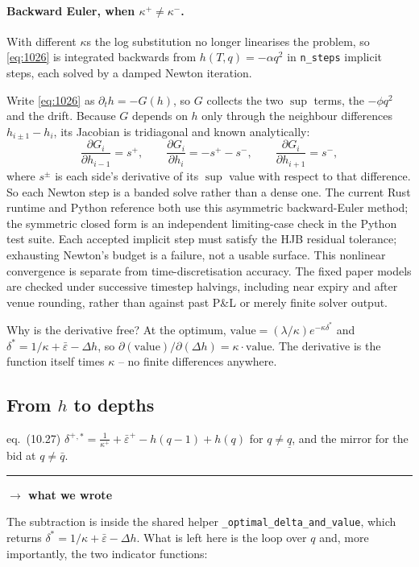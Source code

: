 \documentclass[11pt,a4paper]{article}
\newcommand{\wecode}{\par\vspace{4pt}\noindent
  \textcolor{NavyLink}{\rule{\linewidth}{0.4pt}}\par\vspace{3pt}
  \noindent\textbf{\textcolor{NavyLink}{$\rightarrow$ what we wrote}}\par\vspace{2pt}}
\newcommand{\dplus}{\delta^{+}}
\newcommand{\epsb}{\bar{\varepsilon}}
\newcommand{\code}[1]{\texttt{\small #1}}
\begin{document}
\paragraph{Backward Euler, when $\kappa^{+} \ne \kappa^{-}$.} With different
$\kappa$s the log substitution no longer linearises the problem, so
\eqref{eq:1026} is integrated backwards from $h(T,q) = -\alpha q^{2}$ in
\code{n\_steps} implicit steps, each solved by a damped Newton iteration.

Write \eqref{eq:1026} as $\partial_t h = -G(h)$, so $G$ collects the two $\sup$
terms, the $-\phi q^2$ and the drift. Because $G$ depends on $h$ only through the
neighbour differences $h_{i\pm1} - h_i$, its Jacobian is tridiagonal and known
analytically:
\[
  \frac{\partial G_i}{\partial h_{i-1}} = s^{+},\qquad
  \frac{\partial G_i}{\partial h_{i}} = -s^{+}-s^{-},\qquad
  \frac{\partial G_i}{\partial h_{i+1}} = s^{-},
\]
where $s^{\pm}$ is each side's derivative of its $\sup$ value with respect to
that difference. So each Newton step is a banded solve rather than a dense one.
The current Rust runtime and Python reference both use this asymmetric
backward-Euler method; the symmetric closed form is an independent limiting-case
check in the Python test suite. Each accepted implicit step must satisfy the
HJB residual tolerance; exhausting Newton's budget is a failure, not a usable
surface. This nonlinear convergence is separate from time-discretisation
accuracy. The fixed paper models are checked under successive timestep
halvings, including near expiry and after venue rounding, rather than against
past P\&L or merely finite solver output.

\begin{intuition}
Why is the derivative free? At the optimum, $\text{value} =
(\lambda/\kappa)e^{-\kappa\delta^{*}}$ and $\delta^{*} = 1/\kappa + \epsb -
\Delta h$, so $\partial(\text{value})/\partial(\Delta h) = \kappa \cdot
\text{value}$. The derivative is the function itself times $\kappa$ -- no finite
differences anywhere.
\end{intuition}

\subsection{From \texorpdfstring{$h$}{h} to depths}

\begin{booktocode}{eq.~(10.27)}
$\dplus{}^{,*} = \tfrac{1}{\kappa^{+}} + \epsb^{+} - h(q-1) + h(q)$ for
$q \ne \underline{q}$, and the mirror for the bid at $q \ne \bar{q}$.
\wecode
The subtraction is inside the shared helper \code{\_optimal\_delta\_and\_value},
which returns $\delta^{*} = 1/\kappa + \epsb - \Delta h$. What is left here is
the loop over $q$ and, more importantly, the two indicator functions:
\end{booktocode}
\end{document}
